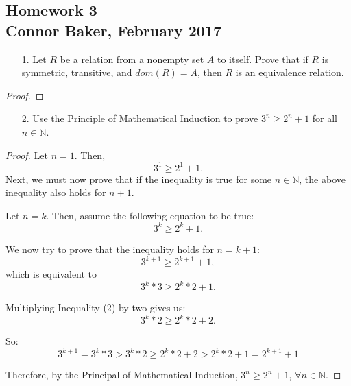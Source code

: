 \documentclass[10pt]{article}
\theoremstyle{definition}
\theoremstyle{plain}
\newcommand{\N}{\mathbb{N}}
\begin{document}
\begin{center}
  \subsection*{Homework 3\\Connor Baker, February 2017}
\end{center}

\begin{enumerate}
\item[1.] Let $R$ be a relation from a nonempty set $A$ to itself.  Prove that if $R$ is symmetric, transitive, and $dom(R) = A$, then $R$ is an equivalence relation.
\end{enumerate}

\begin{proof}
\end{proof}



\pagebreak



\begin{enumerate}
  \item[2.] Use the Principle of Mathematical Induction to prove $3^n \geq 2^n + 1$ for all $n \in \N$.
\end{enumerate}

\begin{proof}
  Let $n=1$. Then,
  \begin{equation}
    3^1 \geq 2^1 + 1.
  \end{equation}
  Next, we must now prove that if the inequality is true for some $n\in\N$, the above inequality also holds for $n+1$.

  \par Let $n=k$. Then, assume the following equation to be true:
  \begin{equation}
    3^k \geq 2^k + 1.
  \end{equation}

  \par We now try to prove that the inequality holds for $n=k+1$:
  \begin{equation}
    3^{k+1} \geq 2^{k+1} + 1,
  \end{equation}
  which is equivalent to
  \begin{equation}
    3^{k}*3 \geq 2^{k}*2 + 1.
  \end{equation}

  \par Multiplying Inequality (2) by two gives us:
  \begin{equation}
    3^{k}*2 \geq 2^{k}*2 + 2.
  \end{equation}

  \par So:
    $$3^{k+1}=3^{k}*3 > 3^{k}*2 \geq 2^{k}*2 + 2 > 2^{k}*2 + 1 = 2^{k+1}+1$$

  \par Therefore, by the Principal of Mathematical Induction, $3^n \geq 2^n + 1$, $\forall n\in\N$.
\end{proof}
\end{document}

